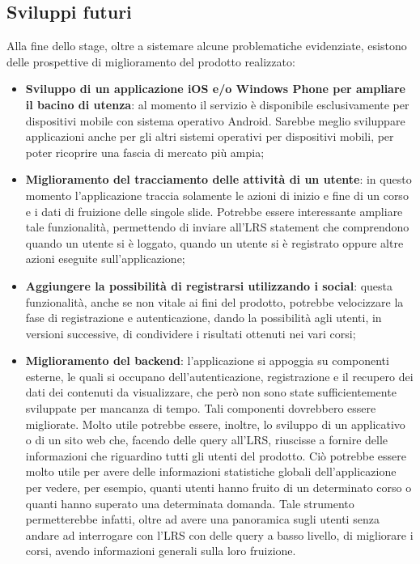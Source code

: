 \documentclass[../Tesi.tex]{subfiles}
\begin{document}
	\subsection{Sviluppi futuri}
	Alla fine dello stage, oltre a sistemare alcune problematiche evidenziate, esistono delle prospettive di miglioramento del prodotto realizzato:
	\begin{itemize}
		\item \textbf{Sviluppo di un applicazione iOS e/o Windows Phone per ampliare il bacino di utenza}: al momento il servizio è disponibile esclusivamente per dispositivi mobile con sistema operativo Android. Sarebbe meglio sviluppare applicazioni anche per gli altri sistemi operativi per dispositivi mobili, per poter ricoprire una fascia di mercato più ampia;
		\item \textbf{Miglioramento del tracciamento delle attività di un utente}: in questo momento l'applicazione traccia solamente le azioni di inizio e fine di un corso e i dati di fruizione delle singole slide. Potrebbe essere interessante ampliare tale funzionalità, permettendo di inviare all'LRS statement che comprendono quando un utente si è loggato, quando un utente si è registrato oppure altre azioni eseguite sull'applicazione;
		\item \textbf{Aggiungere la possibilità di registrarsi utilizzando i social}: questa funzionalità, anche se non vitale ai fini del prodotto, potrebbe velocizzare la fase di registrazione e autenticazione, dando la possibilità agli utenti, in versioni successive, di condividere i risultati ottenuti nei vari corsi;
		\item \textbf{Miglioramento del backend}: l'applicazione si appoggia su componenti esterne, le quali si occupano dell'autenticazione, registrazione e il recupero dei dati dei contenuti da visualizzare, che però non sono state sufficientemente sviluppate per mancanza di tempo. Tali componenti dovrebbero essere migliorate. Molto utile potrebbe essere, inoltre, lo sviluppo di un applicativo o di un sito web che, facendo delle query all'LRS, riuscisse a fornire delle informazioni che riguardino tutti gli utenti del prodotto. Ciò potrebbe essere molto utile per avere delle informazioni statistiche globali dell'applicazione per vedere, per esempio, quanti utenti hanno fruito di un determinato corso o quanti hanno superato una determinata domanda. Tale strumento permetterebbe infatti, oltre ad avere una panoramica sugli utenti senza andare ad interrogare con l'LRS con delle query a basso livello, di migliorare i corsi, avendo informazioni generali sulla loro fruizione.
	\end{itemize}
\end{document}

